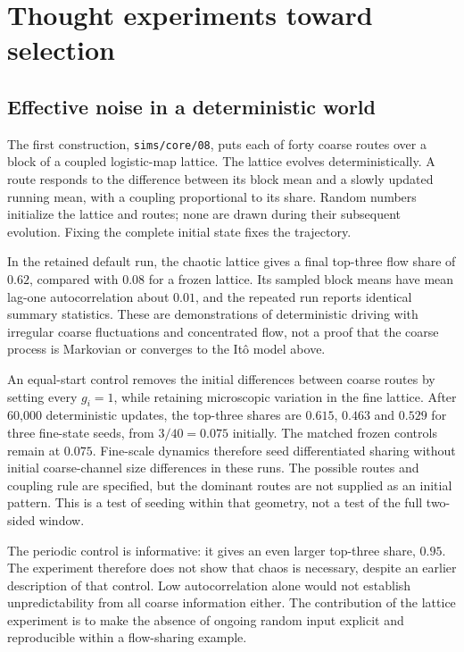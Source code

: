 \section{Thought experiments toward selection}
\label{sec:thought}

\subsection{Effective noise in a deterministic world}

The first construction, \texttt{sims/core/08}, puts each of forty coarse routes
over a block of a coupled logistic-map lattice. The lattice evolves
deterministically. A route responds to the difference between its block mean
and a slowly updated running mean, with a coupling proportional to its share.
Random numbers initialize the lattice and routes; none are drawn during their
subsequent evolution. Fixing the complete initial state fixes the trajectory.

In the retained default run, the chaotic lattice gives a final top-three flow
share of $0.62$, compared with $0.08$ for a frozen lattice. Its sampled block
means have mean lag-one autocorrelation about $0.01$, and the repeated run
reports identical summary statistics. These are demonstrations of deterministic
driving with irregular coarse fluctuations and concentrated flow, not a proof
that the coarse process is Markovian or converges to the It\^o model above.

An equal-start control removes the initial differences between coarse routes
by setting every $g_i=1$, while retaining microscopic variation in the fine
lattice. After 60,000 deterministic updates, the top-three shares are $0.615$,
$0.463$ and $0.529$ for three fine-state seeds, from $3/40=0.075$ initially.
The matched frozen controls remain at $0.075$. Fine-scale dynamics therefore
seed differentiated sharing without initial coarse-channel size differences
in these runs. The possible routes and coupling rule are specified, but the
dominant routes are not supplied as an initial pattern. This is a test of
seeding within that geometry, not a test of the full two-sided window.

The periodic control is informative: it gives an even larger top-three share,
$0.95$. The experiment therefore does not show that chaos is necessary, despite
an earlier description of that control. Low autocorrelation alone would not
establish unpredictability from all coarse information either. The contribution
of the lattice experiment is to make the absence of ongoing random input
explicit and reproducible within a flow-sharing example.


